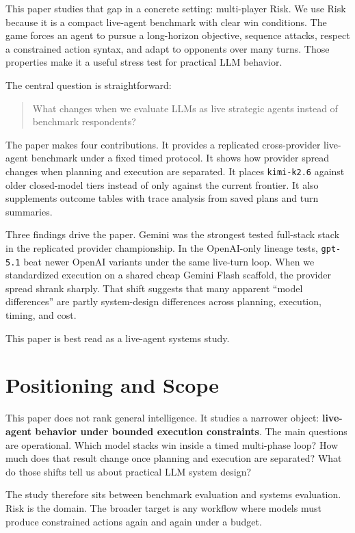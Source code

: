 \documentclass[11pt]{article}
\begin{document}
This paper studies that gap in a concrete setting: multi-player Risk. We use Risk because it is a compact live-agent benchmark with clear win conditions. The game forces an agent to pursue a long-horizon objective, sequence attacks, respect a constrained action syntax, and adapt to opponents over many turns. Those properties make it a useful stress test for practical LLM behavior.

The central question is straightforward:

\begin{quote}
What changes when we evaluate LLMs as live strategic agents instead of benchmark respondents?
\end{quote}

The paper makes four contributions. It provides a replicated cross-provider live-agent benchmark under a fixed timed protocol. It shows how provider spread changes when planning and execution are separated. It places \texttt{kimi-k2.6} against older closed-model tiers instead of only against the current frontier. It also supplements outcome tables with trace analysis from saved plans and turn summaries.

Three findings drive the paper. Gemini was the strongest tested full-stack stack in the replicated provider championship. In the OpenAI-only lineage tests, \texttt{gpt-5.1} beat newer OpenAI variants under the same live-turn loop. When we standardized execution on a shared cheap Gemini Flash scaffold, the provider spread shrank sharply. That shift suggests that many apparent ``model differences'' are partly system-design differences across planning, execution, timing, and cost.

This paper is best read as a live-agent systems study.

\section{Positioning and Scope}

This paper does not rank general intelligence. It studies a narrower object: \textbf{live-agent behavior under bounded execution constraints}. The main questions are operational. Which model stacks win inside a timed multi-phase loop? How much does that result change once planning and execution are separated? What do those shifts tell us about practical LLM system design?

The study therefore sits between benchmark evaluation and systems evaluation. Risk is the domain. The broader target is any workflow where models must produce constrained actions again and again under a budget.
\end{document}

